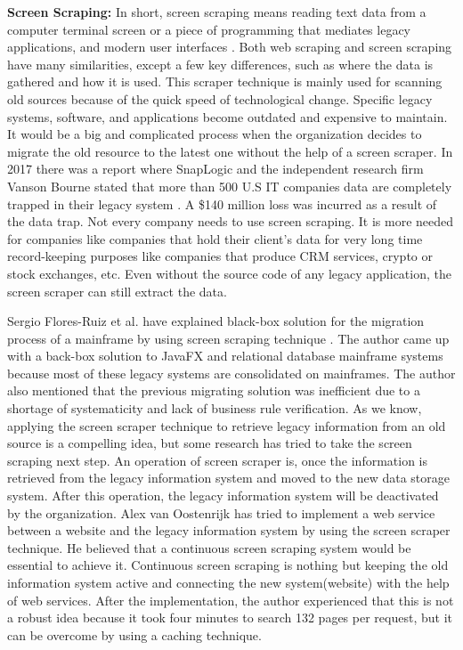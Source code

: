 {\bf Screen Scraping:} In short, screen scraping means reading text data from a computer terminal screen or a piece of programming that mediates legacy applications, and modern user interfaces \cite{Alex2021}. Both web scraping and screen scraping have many similarities, except a few key differences, such as where the data is gathered and how it is used. This scraper technique is mainly used for scanning old sources because of the quick speed of technological change. Specific legacy systems, software, and applications become outdated and expensive to maintain. It would be a big and complicated process when the organization decides to migrate the old resource to the latest one without the help of a screen scraper. In 2017 there was a report where SnapLogic and the independent research firm Vanson Bourne stated that more than 500 U.S IT companies data are completely trapped in their legacy system \cite{Snap}. A \$140 million loss was incurred as a result of the data trap. Not every company needs to use screen scraping. It is more needed for companies like companies that hold their client's data for very long time record-keeping purposes like companies that produce CRM services, crypto or stock exchanges, etc. Even without the source code of any legacy application, the screen scraper can still extract the data. 

Sergio Flores-Ruiz et al. have explained black-box solution for the migration process of a mainframe by using screen scraping technique \cite{FlPeDoPu2018}. The author came up with a back-box solution to JavaFX and relational database mainframe systems because most of these legacy systems are consolidated on mainframes. The author also mentioned that the previous migrating solution was inefficient due to a shortage of systematicity and lack of business rule verification. As we know, applying the screen scraper technique to retrieve legacy information from an old source is a compelling idea, but some research has tried to take the screen scraping next step. An operation of screen scraper is, once the information is retrieved from the legacy information system and moved to the new data storage system. After this operation, the legacy information system will be deactivated by the organization. Alex van Oostenrijk \cite{Alex2004} has tried to implement a web service between a website and the legacy information system by using the screen scraper technique. He believed that a continuous screen scraping system would be essential to achieve it. Continuous screen scraping is nothing but keeping the old information system active and connecting the new system(website) with the help of web services. After the implementation, the author experienced that this is not a robust idea because it took four minutes to search 132 pages per request, but it can be overcome by using a caching technique.

